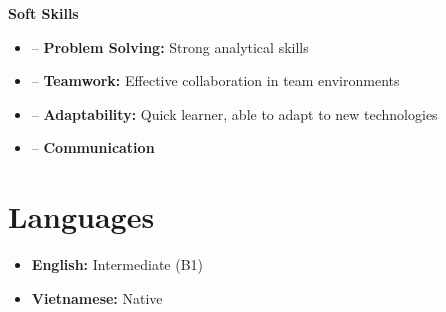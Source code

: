 \documentclass[a4paper,12pt]{article}
\newenvironment{itemList}[3][]
    {
    \noindent\hspace{1em}\textbf{#2}\hfill#3\\[3.75pt]
    \begin{minipage}[t]{\linewidth}
    \begin{itemize}[nosep,after=\strut, leftmargin=2em, itemsep=3pt,label={},#1]
    }
    {
    \end{itemize}
    \end{minipage}
    }
\begin{document}
\begin{itemList}[itemsep=5pt]{Soft Skills}{}
    \item -- \textbf{Problem Solving:} Strong analytical skills
    \item -- \textbf{Teamwork:} Effective collaboration in team environments
    \item -- \textbf{Adaptability:} Quick learner, able to adapt to new technologies
    \item -- \textbf{Communication}
\end{itemList}

\section{Languages}
\begin{itemize}[nosep,after=\strut, leftmargin=1em, itemsep=4pt, label={}]
    \item \textbf{English:} Intermediate (B1)
    \item \textbf{Vietnamese:} Native
\end{itemize}

\vfill
{}
\end{document}
